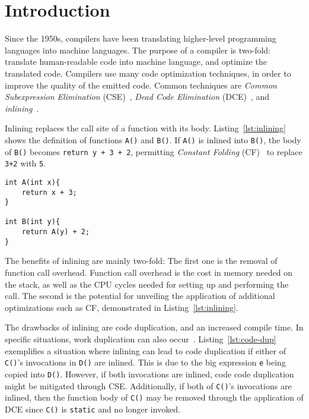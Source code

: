 
\section{Introduction}
\label{introduction}

Since the 1950s, compilers have been translating higher-level programming
languages into machine languages. The purpose of a compiler is two-fold:
translate human-readable code into machine language, and optimize the translated
code. Compilers use many code optimization techniques, in order to improve the
quality of the emitted code. Common techniques are \textit{Common Subexpression
Elimination} (CSE)~\cite[Ch. 8.5]{DragonBook}, \textit{Dead Code Elimination}
(DCE)~\cite[Ch. 8.5]{DragonBook}, and \textit{inlining}~\cite[Ch.
12.1]{DragonBook}.

Inlining replaces the call site of a function with its body.
Listing~\ref{lst:inlining} shows the definition of functions \lstinline!A()! and
\lstinline!B()!. If \lstinline!A()! is inlined into \lstinline!B()!, the body of
\lstinline!B()! becomes \lstinline!return y + 3 + 2!, permitting
\textit{Constant Folding} (CF)~\cite[Ch. 8.5]{DragonBook} to replace
\lstinline!3+2! with \lstinline!5!.

\begin{centering}
	\noindent\begin{minipage}{\textwidth}
		\begin{CenteredBox}
		\begin{lstlisting}[style=global_customcpp]
int A(int x){
	return x + 3;
}

int B(int y){
	return A(y) + 2;
}
		\end{lstlisting}
		\end{CenteredBox}
	\end{minipage}
	\label{lst:inlining}
\end{centering}

The benefits of inlining are mainly two-fold: The first one is the removal of
function call overhead. Function call overhead is the cost in memory needed on
the stack, as well as the CPU cycles needed for setting up and performing the
call. The second is the potential for unveiling the application of additional
optimizations such as CF, demonstrated in Listing~\ref{lst:inlining}.

The drawbacks of inlining are code duplication, and an increased compile time.
In specific situations, work duplication can also occur~\cite{GHCPaper}.
Listing~\ref{lst:code-dup} exemplifies a situation where inlining can lead to
code duplication if either of \lstinline!C()!'s invocations in \lstinline!D()!
are inlined. This is due to the big expression \lstinline!e! being copied into
\lstinline!D()!. However, if both invocations are inlined, code code duplication
might be mitigated through CSE. Additionally, if both of \lstinline!C()!'s
invocations are inlined, then the function body of \lstinline!C()! may be
removed through the application of DCE since \lstinline!C()! is
\lstinline!static! and no longer invoked.

